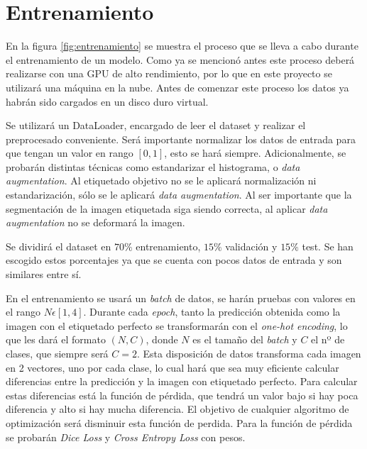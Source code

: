\pagebreak \section{Entrenamiento}\label{sec:entrenamiento}


En la figura \ref{fig:entrenamiento} se muestra el proceso que se lleva a cabo durante el entrenamiento de un modelo. Como ya se mencionó antes este proceso deberá realizarse con una GPU de alto rendimiento, por lo que en este proyecto se utilizará una máquina en la nube. Antes de comenzar este proceso los datos ya habrán sido cargados en un disco duro virtual.

Se utilizará un DataLoader, encargado de leer el dataset y realizar el preprocesado conveniente. Será importante normalizar los datos de entrada para que tengan un valor en rango $ [0, 1] $, esto se hará siempre. Adicionalmente, se probarán distintas técnicas como estandarizar el histograma, o \textit{data augmentation}. Al etiquetado objetivo no se le aplicará normalización ni estandarización, sólo se le aplicará \textit{data augmentation}. Al ser importante que la segmentación de la imagen etiquetada siga siendo correcta, al aplicar \textit{data augmentation} no se deformará la imagen.

Se dividirá el dataset en $ 70\% $ entrenamiento, $ 15\% $ validación y $ 15\% $ test. Se han escogido estos porcentajes ya que se cuenta con pocos datos de entrada y son similares entre sí.

En el entrenamiento se usará un \textit{batch} de datos, se harán pruebas con valores en el rango $N\epsilon[1,4]$. Durante cada \textit{epoch}, tanto la predicción obtenida como la imagen con el etiquetado perfecto se transformarán con el \textit{one-hot encoding}, lo que les dará el formato $(N, C)$, donde $N$ es el tamaño del \textit{batch} y $C$ el nº de clases, que siempre será $C=2$. Esta disposición de datos transforma cada imagen en 2 vectores, uno por cada clase, lo cual hará que sea muy eficiente calcular diferencias entre la predicción y la imagen con etiquetado perfecto. Para calcular estas diferencias está la función de pérdida, que tendrá un valor bajo si hay poca diferencia y alto si hay mucha diferencia. El objetivo de cualquier algoritmo de optimización será disminuir esta función de perdida. Para la función de pérdida se probarán \textit{Dice Loss} y \textit{Cross Entropy Loss} con pesos. 

